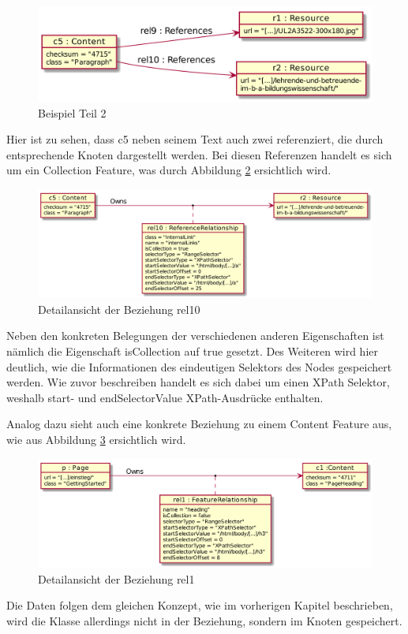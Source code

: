     \begin{figure}[htb]
        \centering
        \includegraphics[scale=\imageScalingFactor]{../resources/db-data-model/example/example_part2.png}
        \caption{Beispiel Teil 2}
        \label{image:dbDataModelExampleOverviewPart2}
    \end{figure}

    Hier ist zu sehen, dass c5 neben seinem Text auch zwei {\resource} referenziert,
    die durch entsprechende Knoten dargestellt werden.
    Bei diesen Referenzen handelt es sich um ein Collection Feature,
    was durch Abbildung \ref{image:dbDataModelExampleRel10} ersichtlich wird.

    \begin{figure}[htb]
        \centering
        \includegraphics[scale=\imageScalingFactor]{../resources/db-data-model/example/c5-r2.png}
        \caption{Detailansicht der Beziehung rel10}
        \label{image:dbDataModelExampleRel10}
    \end{figure}

    Neben den konkreten Belegungen der verschiedenen anderen Eigenschaften ist nämlich
    die Eigenschaft isCollection auf true gesetzt.
    Des Weiteren wird hier deutlich, wie die Informationen des eindeutigen Selektors des Nodes gespeichert werden.
    Wie zuvor beschreiben handelt es sich dabei um einen XPath Selektor,
    weshalb start- und endSelectorValue XPath-Ausdrücke enthalten.

    Analog dazu sieht auch eine konkrete Beziehung zu einem Content Feature aus,
    wie aus Abbildung \ref{image:dbDataModelExampleRel1} ersichtlich wird.

    \begin{figure}[htb]
        \centering
        \includegraphics[scale=\imageScalingFactor]{../resources/db-data-model/example/p-c1.png}
        \caption{Detailansicht der Beziehung rel1}
        \label{image:dbDataModelExampleRel1}
    \end{figure}

    Die Daten folgen dem gleichen Konzept, wie im vorherigen Kapitel beschrieben,
    wird die Klasse allerdings nicht in der Beziehung, sondern im Knoten gespeichert.

